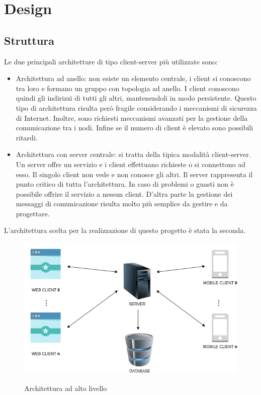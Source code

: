 \section{Design}

\subsection{Struttura}
Le due principali architetture di tipo client-server più utilizzate sono:
\begin{itemize}
    \item Architettura ad anello: non esiste un elemento centrale, i client si conoscono tra loro e formano un gruppo con topologia ad anello. I client conoscono quindi gli indirizzi di tutti gli altri, mantenendoli in modo persistente.
    Questo tipo di architettura risulta però fragile considerando i meccanismi di sicurezza di Internet. Inoltre, sono richiesti meccanismi avanzati per la gestione della comunicazione tra i nodi. Infine se il numero di client è elevato sono possibili ritardi.
    \item Architettura con server centrale: si tratta della tipica modalità client-server. Un server offre un servizio e i client effettuano richieste o si connettono ad esso.
    Il singolo client non vede e non conosce gli altri.
    Il server rappresenta il punto critico di tutta l'architettura. In caso di problemi o guasti non è possibile offrire il servizio a nessun client. D'altra parte la gestione dei messaggi di comunicazione risulta molto più semplice da gestire e da progettare.
\end{itemize}

\noindent L’architettura scelta per la realizzazione di questo progetto è stata la seconda.

\begin{figure}[H]
    \caption{Architettura ad alto livello}
    \centering
    \includegraphics[width=120mm]{img/ingSoft/Architecture.png}
    \label{fig:base_architecture}
\end{figure}

